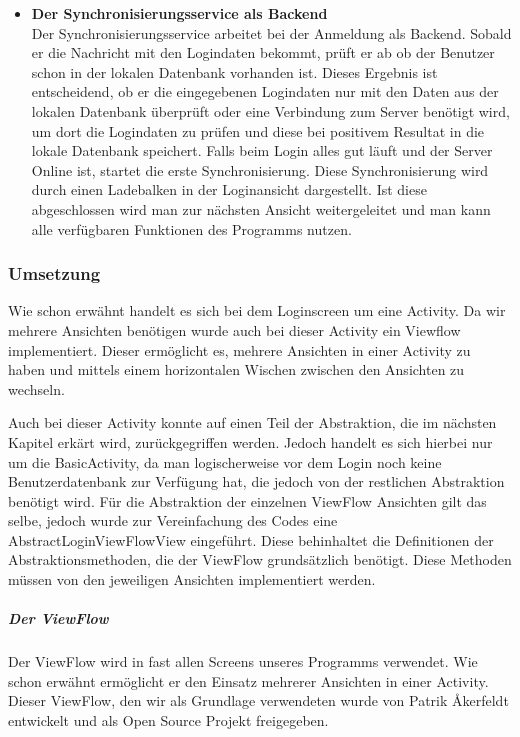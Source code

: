 \begin{itemize}
\begin{itemize}
 
\end{itemize}
\item{\textbf{Der Synchronisierungsservice als Backend}}\\
Der Synchronisierungsservice arbeitet bei der Anmeldung als Backend. Sobald er die Nachricht mit den Logindaten bekommt, prüft er ab ob der Benutzer schon in der lokalen Datenbank vorhanden ist. Dieses Ergebnis ist entscheidend, ob er die eingegebenen Logindaten nur  mit den Daten aus der lokalen Datenbank überprüft oder eine Verbindung zum Server benötigt wird, um dort die Logindaten zu prüfen und diese bei positivem Resultat in die lokale Datenbank speichert. 
Falls beim Login alles gut läuft und der Server Online ist, startet die erste Synchronisierung. Diese Synchronisierung wird durch einen Ladebalken in der Loginansicht dargestellt. Ist diese abgeschlossen wird man zur nächsten Ansicht weitergeleitet und man kann alle verfügbaren Funktionen des Programms nutzen.

\end{itemize}


\subsubsection{Umsetzung}
Wie schon erwähnt handelt es sich bei dem Loginscreen um eine Activity. Da wir mehrere Ansichten benötigen wurde auch bei dieser Activity ein Viewflow implementiert. Dieser ermöglicht es, mehrere Ansichten in einer Activity zu haben und mittels einem horizontalen Wischen zwischen den Ansichten zu wechseln.

Auch bei dieser Activity konnte auf einen Teil der Abstraktion, die im nächsten Kapitel erkärt wird, zurückgegriffen werden. Jedoch handelt es sich hierbei nur um die BasicActivity, da man logischerweise vor dem Login noch keine Benutzerdatenbank zur Verfügung hat, die jedoch von der restlichen Abstraktion benötigt wird. Für die Abstraktion der einzelnen ViewFlow Ansichten gilt das selbe, jedoch wurde zur Vereinfachung des Codes eine AbstractLoginViewFlowView eingeführt. Diese behinhaltet die Definitionen der Abstraktionsmethoden, die der ViewFlow grundsätzlich benötigt. Diese Methoden müssen von den jeweiligen Ansichten implementiert werden.




\subparagraph{Der ViewFlow}
Der ViewFlow wird in fast allen Screens unseres Programms verwendet. Wie schon erwähnt ermöglicht er den Einsatz mehrerer Ansichten in einer Activity. Dieser ViewFlow, den wir als Grundlage verwendeten wurde von  Patrik Åkerfeldt entwickelt und als Open Source Projekt freigegeben.

